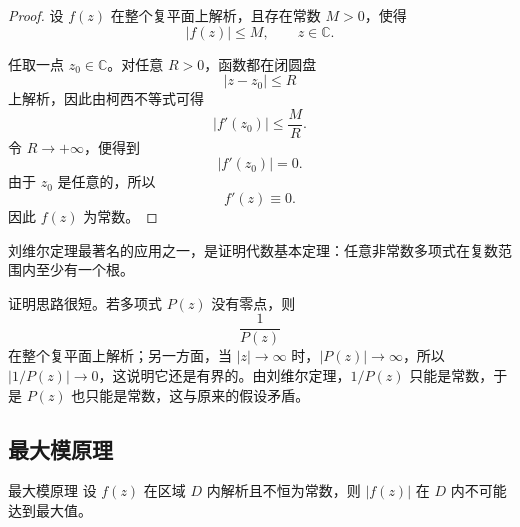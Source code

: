 \begin{proof}
设 $f(z)$ 在整个复平面上解析，且存在常数 $M>0$，使得
\[
    |f(z)|\le M,\qquad z\in\mathbb{C}.
\]

任取一点 $z_0\in\mathbb{C}$。对任意 $R>0$，函数都在闭圆盘
\[
    |z-z_0|\le R
\]
上解析，因此由柯西不等式可得
\[
    |f'(z_0)|\le \frac{M}{R}.
\]
令 $R\to+\infty$，便得到
\[
    |f'(z_0)|=0.
\]
由于 $z_0$ 是任意的，所以
\[
    f'(z)\equiv 0.
\]
因此 $f(z)$ 为常数。
\end{proof}

\begin{wulibj}
刘维尔定理最著名的应用之一，是证明代数基本定理：任意非常数多项式在复数范围内至少有一个根。

证明思路很短。若多项式 $P(z)$ 没有零点，则
\[
    \frac{1}{P(z)}
\]
在整个复平面上解析；另一方面，当 $|z|\to\infty$ 时，$|P(z)|\to\infty$，所以 $|1/P(z)|\to 0$，这说明它还是有界的。由刘维尔定理，$1/P(z)$ 只能是常数，于是 $P(z)$ 也只能是常数，这与原来的假设矛盾。
\end{wulibj}

\subsection{最大模原理}

\begin{dingli}{最大模原理}{}
设 $f(z)$ 在区域 $D$ 内解析且不恒为常数，则 $|f(z)|$ 在 $D$ 内不可能达到最大值。
\end{dingli}

